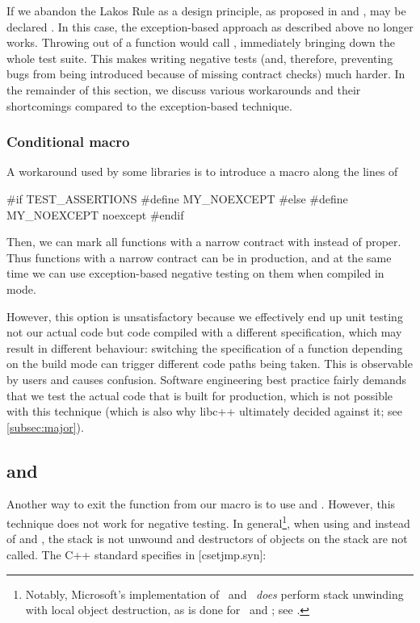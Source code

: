 If we abandon the Lakos Rule as a design principle, as proposed in \cite{P1656R2} and \cite{P2148R0},  may be declared . In this case, the exception-based approach as described above no longer works. Throwing  out of a  function would call , immediately bringing down the whole test suite. This makes writing negative tests (and, therefore, preventing bugs from being introduced because of missing contract checks) much harder. In the remainder of this section, we discuss various workarounds and their shortcomings compared to the exception-based technique.

\subsubsection{Conditional  macro}
\label{subsubsec:conditional}

A workaround used by some libraries is to introduce a macro along the lines of
\begin{codeblock}
#if TEST_ASSERTIONS
  #define MY_NOEXCEPT 
#else
  #define MY_NOEXCEPT noexcept
#endif
\end{codeblock}
Then, we can mark all functions with a narrow contract with  instead of  proper. Thus functions with a narrow contract can be  in production, and at the same time we can use exception-based negative testing on them when compiled in \mbox{} mode.

However, this option is  unsatisfactory because we effectively end up unit testing not our actual code but code compiled with a different specification, which may result in different behaviour: switching the  specification of a function depending on the build mode can trigger different code paths being taken. This is observable by users and causes confusion. Software engineering best practice fairly demands that we test the actual code that is built for production, which is not possible with this technique (which is also why libc++ ultimately decided against it; see \ref{subsec:major}).

\subsection{ and }

Another way to exit the function from our  macro is to use  and . However, this technique does not work for negative testing. In general\footnote{Notably, Microsoft's implementation of   and  \emph{does} perform stack unwinding with local object destruction, as is done for  and ; see \cite{MSVCDocLongjmp}.}, when using  and  instead of  and , the stack is not unwound and destructors of objects on the stack are not called. The C++ standard specifies in [csetjmp.syn]:

